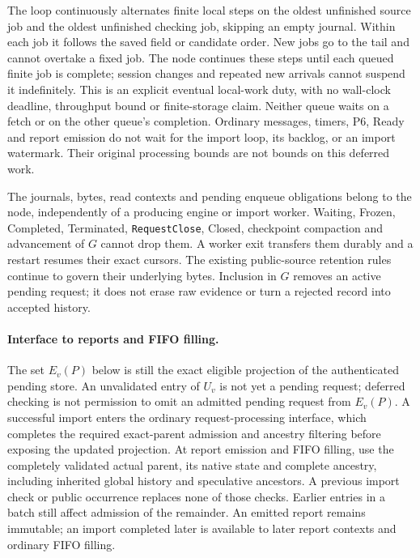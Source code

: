The loop continuously alternates finite local steps on the oldest
unfinished source job and the oldest unfinished checking job, skipping
an empty journal. Within each job it follows the saved field or
candidate order. New jobs go to the tail and cannot overtake a fixed
job. The node continues these steps until each queued finite job is
complete; session changes and repeated new arrivals cannot suspend it
indefinitely. This is an explicit eventual local-work duty, with no
wall-clock deadline, throughput bound or finite-storage claim.
Neither queue waits on a fetch or on the other queue's completion.
Ordinary messages, timers, P6, Ready and report emission do not wait for
the import loop, its backlog, or an import watermark. Their original
processing bounds are not bounds on this deferred work.

The journals, bytes, read contexts and pending enqueue obligations belong
to the node, independently of a producing engine or import worker.
Waiting, Frozen, Completed, Terminated, \texttt{RequestClose}, Closed,
checkpoint compaction and advancement of $G$ cannot drop them. A worker
exit transfers them durably and a restart resumes their exact cursors.
The existing public-source retention rules continue to govern their
underlying bytes. Inclusion in $G$ removes an active pending request;
it does not erase raw evidence or turn a rejected record into accepted
history.

\paragraph{Interface to reports and FIFO filling.}
The set $E_v(P)$ below is still the exact eligible projection of the
authenticated pending store. An unvalidated entry of $U_v$ is not yet a
pending request; deferred checking is not permission to omit an admitted
pending request from $E_v(P)$. A successful import enters the ordinary
request-processing interface, which completes the required exact-parent
admission and ancestry filtering before exposing the updated projection.
At report emission and FIFO filling, use the completely validated actual
parent, its native state and complete ancestry, including inherited
global history and speculative ancestors. A previous import check or
public occurrence replaces none of those checks. Earlier entries in a
batch still affect admission of the remainder. An emitted report remains
immutable; an import completed later is available to later report
contexts and ordinary FIFO filling.

